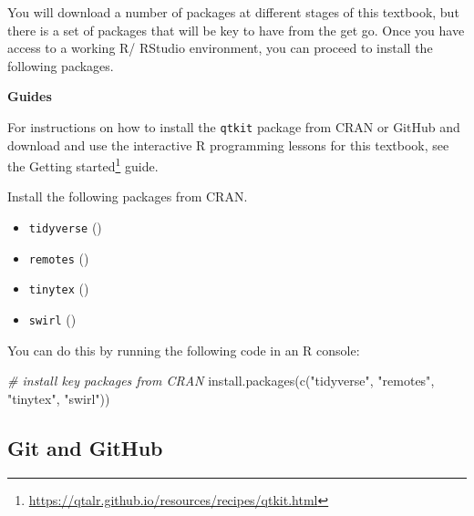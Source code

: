 \documentclass[
  letterpaper,
]{latex/krantz}
\newenvironment{Shaded}{\begin{snugshade}}{\end{snugshade}}
\newcommand{\CommentTok}[1]{\textcolor[rgb]{0.00,0.00,0.00}{\textit{#1}}}
\newcommand{\FunctionTok}[1]{\textcolor[rgb]{0.00,0.00,0.00}{#1}}
\newcommand{\NormalTok}[1]{\textcolor[rgb]{0.00,0.00,0.00}{#1}}
\newcommand{\StringTok}[1]{\textcolor[rgb]{0.00,0.00,0.00}{#1}}
\providecommand{\tightlist}{%
  \setlength{\itemsep}{0pt}\setlength{\parskip}{0pt}}\usepackage{longtable,booktabs,array}
\theoremstyle{definition}
\theoremstyle{remark}
\DeclareRobustCommand{\href}[2]{#2\footnote{\url{#1}}}
\begin{document}
You will download a number of packages at different stages of this
textbook, but there is a set of packages that will be key to have from
the get go. Once you have access to a working R/ RStudio environment,
you can proceed to install the following packages.

\begin{tcolorbox}[enhanced jigsaw, breakable, leftrule=.75mm, arc=.35mm, colframe=quarto-callout-color-frame, colback=white, left=2mm, bottomrule=.15mm, rightrule=.15mm, toprule=.15mm, opacityback=0]

\textbf{ Guides}

For instructions on how to install the \texttt{qtkit} package from CRAN
or GitHub and download and use the interactive R programming lessons for
this textbook, see the
\href{https://qtalr.github.io/resources/recipes/qtkit.html}{Getting
started} guide.

\end{tcolorbox}

Install the following packages from CRAN.

\begin{itemize}
\tightlist
\item
  \texttt{tidyverse} ()
\item
  \texttt{remotes} ()
\item
  \texttt{tinytex} ()
\item
  \texttt{swirl} ()
\end{itemize}

You can do this by running the following code in an R console:

\begin{Shaded}
\begin{Highlighting}[]
\CommentTok{\# install key packages from CRAN}
\FunctionTok{install.packages}\NormalTok{(}\FunctionTok{c}\NormalTok{(}\StringTok{"tidyverse"}\NormalTok{, }\StringTok{"remotes"}\NormalTok{, }\StringTok{"tinytex"}\NormalTok{, }\StringTok{"swirl"}\NormalTok{))}
\end{Highlighting}
\end{Shaded}

\subsection*{Git and GitHub}\label{sec-p-git-github}
\end{document}
